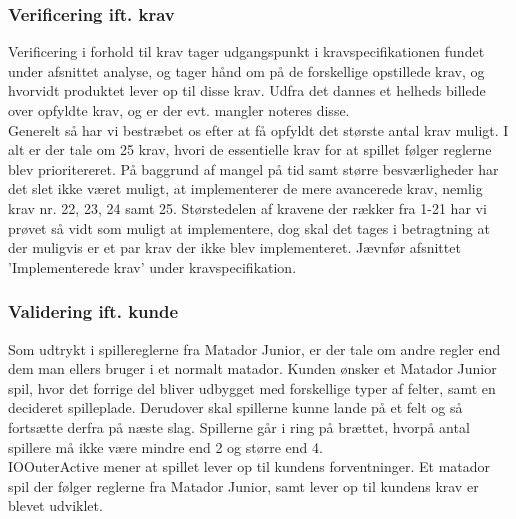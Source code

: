 \subsubsection{Verificering ift. krav}
Verificering i forhold til krav tager udgangspunkt i kravspecifikationen fundet under afsnittet analyse, og tager hånd om på de forskellige opstillede krav, og hvorvidt produktet lever op til disse krav. Udfra det dannes et helheds billede over opfyldte krav, og er der evt. mangler noteres disse.\\
Generelt så har vi bestræbet os efter at få opfyldt det største antal krav muligt. I alt er der tale om 25 krav, hvori de essentielle krav for at spillet følger reglerne blev prioritereret. På baggrund af mangel på tid samt større besværligheder har det slet ikke været muligt, at implementerer de mere avancerede krav, nemlig krav nr. 22, 23, 24 samt 25. Størstedelen af kravene der rækker fra 1-21 har vi prøvet så vidt som muligt at implementere, dog skal det tages i betragtning at der muligvis er et par krav der ikke blev implementeret. Jævnfør afsnittet 'Implementerede krav' under kravspecifikation.\\

\subsubsection{Validering ift. kunde}
Som udtrykt i spillereglerne fra Matador Junior, er der tale om andre regler end dem man ellers bruger i et normalt matador. Kunden ønsker et Matador Junior spil, hvor det forrige del bliver udbygget med forskellige typer af felter, samt en decideret spilleplade. Derudover skal spillerne kunne lande på et felt og så fortsætte derfra på næste slag. Spillerne går i ring på brættet, hvorpå antal spillere må ikke være mindre end 2 og større end 4.
\\
IOOuterActive mener at spillet lever op til kundens forventninger. Et matador spil der følger reglerne fra Matador Junior, samt lever op til kundens krav er blevet udviklet.\\